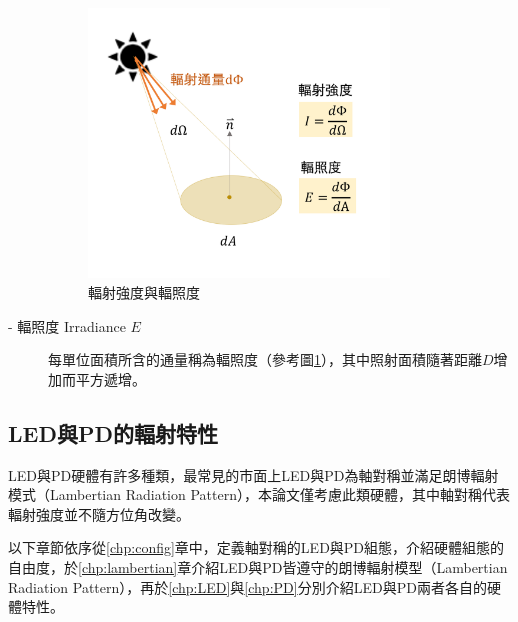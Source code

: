 \begin{description}
                \begin{figure}[ht]
                    \centering
                    \includegraphics[width=8cm]{ch2pic/intensity_irradiance.png}
                    \caption{輻射強度與輻照度}
                    \label{pic:intensity_irradiance}
                \end{figure}

            \item[- 輻照度 Irradiance $E$] \hfill
                
                \qquad
                每單位面積所含的通量稱為輻照度（參考圖\ref{pic:intensity_irradiance}），其中照射面積隨著距離$D$增加而平方遞增。

                
             
        \end{description}

        

        

    \subsection{LED與PD的輻射特性}
    \label{chp:LEDPD_radiate}

    LED與PD硬體有許多種類，最常見的市面上LED與PD為軸對稱並滿足朗博輻射模式（Lambertian Radiation Pattern），本論文僅考慮此類硬體，其中軸對稱代表輻射強度並不隨方位角改變。

    以下章節依序從\ref{chp:config}章中，定義軸對稱的LED與PD組態，介紹硬體組態的自由度，於\ref{chp:lambertian}章介紹LED與PD皆遵守的朗博輻射模型（Lambertian Radiation Pattern），再於\ref{chp:LED}與\ref{chp:PD}分別介紹LED與PD兩者各自的硬體特性。
        
